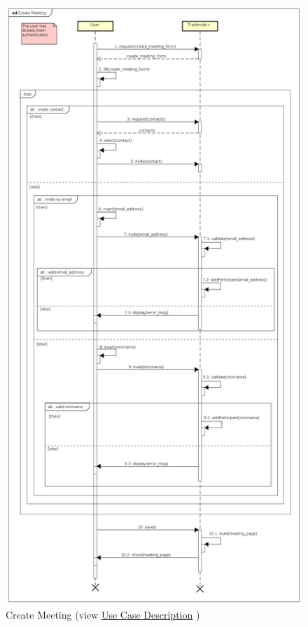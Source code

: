 \begin{figure}[h]
	\centering\includegraphics[height=.98\textheight]{Images/SequenceDiagrams/User/CreateMeeting.png}{}
	\caption[Create Meeting]{{Create Meeting}\label{SeqDiagr:CreateMeeting} (view \hyperref[UseCaseDescr:CreateMeeting]{Use Case Description} )}
\end{figure}

